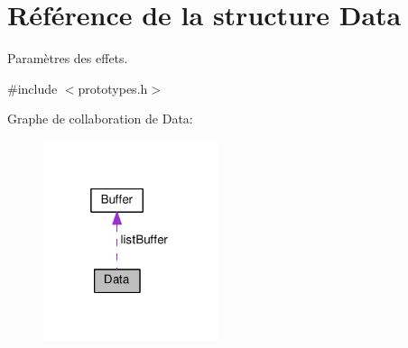 \hypertarget{structData}{}\section{Référence de la structure Data}
\label{structData}


Paramètres des effets.  




{\ttfamily \#include $<$prototypes.\+h$>$}



Graphe de collaboration de Data\+:\nopagebreak
\begin{figure}[H]
\begin{center}
\leavevmode
\includegraphics[width=145pt]{structData__coll__graph}
\end{center}
\end{figure}
